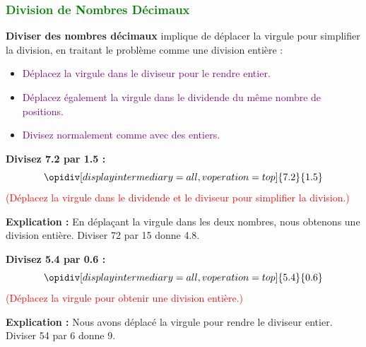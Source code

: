 \documentclass{article}
\begin{document}
\subsubsection{\textcolor{green}{Division de Nombres Décimaux}}

\vspace{0.25cm}

\textbf{Diviser des nombres décimaux} implique de déplacer la virgule pour simplifier la division, en traitant le problème comme une division entière :

    \begin{itemize}
        \item \textcolor{purple}{Déplacez la virgule dans le diviseur pour le rendre entier.}
        \item \textcolor{purple}{Déplacez également la virgule dans le dividende du même nombre de positions.}
        \item \textcolor{purple}{Divisez normalement comme avec des entiers.}
    \end{itemize}

\vspace{0.2cm}

\begin{tcolorbox}[colback=orange!10!white, colframe=orange!75!black, sharp corners=south, boxrule=0.8mm, title=Exemple de Division]
    \textbf{Divisez 7.2 par 1.5 :}
    \[
    \opidiv[displayintermediary=all,voperation=top]{7.2}{1.5}
    \]
    \textcolor{red}{(Déplacez la virgule dans le dividende et le diviseur pour simplifier la division.)}
    
    \textbf{Explication :} En déplaçant la virgule dans les deux nombres, nous obtenons une division entière. Diviser 72 par 15 donne 4.8.
\end{tcolorbox}

\begin{tcolorbox}[colback=orange!10!white, colframe=orange!75!black, sharp corners=south, boxrule=0.8mm, title=Exemple de Division]
    \textbf{Divisez 5.4 par 0.6 :}
    \[
    \opidiv[displayintermediary=all,voperation=top]{5.4}{0.6}
    \]
    \textcolor{red}{(Déplacez la virgule pour obtenir une division entière.)}
    
    \textbf{Explication :} Nous avons déplacé la virgule pour rendre le diviseur entier. Diviser 54 par 6 donne 9.
\end{tcolorbox}

\vspace{0.35cm}
\end{document}

